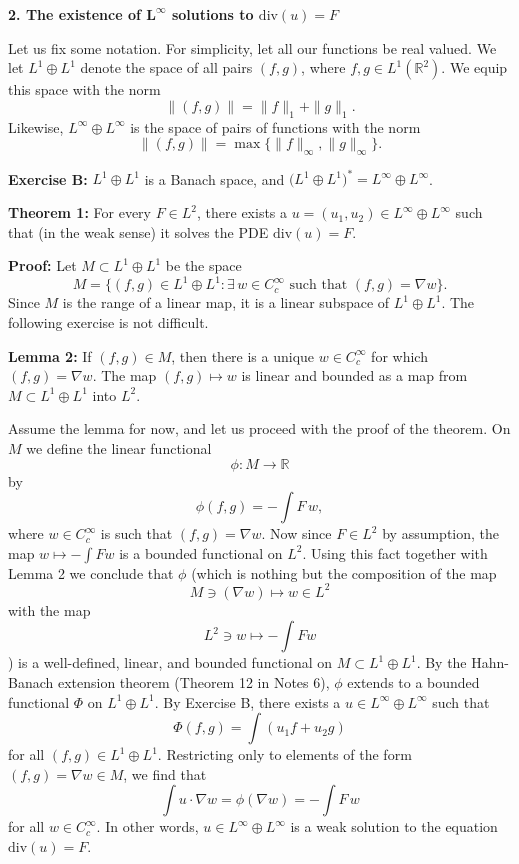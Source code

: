 \documentclass[12pt]{article}
\begin{document}
\bigskip

\noindent
\textbf{2. The existence of \(\boldsymbol{L^\infty}\) solutions to \(\mathrm{div}(u) = F\)}

Let us fix some notation. For simplicity, let all our functions be real valued. We let \(L^1 \oplus L^1\) denote the space of all pairs \((f,g)\), where \(f,g \in L^1(\mathbb{R}^2)\). We equip this space with the norm
\[
\|(f,g)\| = \|f\|_1 + \|g\|_1.
\]
Likewise, \(L^\infty \oplus L^\infty\) is the space of pairs of functions with the norm
\[
\|(f,g)\| = \max\{\|f\|_\infty, \|g\|_\infty\}.
\]

\medskip
\noindent
\textbf{Exercise B:} \(L^1 \oplus L^1\) is a Banach space, and \(\bigl(L^1 \oplus L^1\bigr)^* = L^\infty \oplus L^\infty\).

\medskip
\noindent
\textbf{Theorem 1:} For every \(F \in L^2\), there exists a \(u = (u_1, u_2) \in L^\infty \oplus L^\infty\) such that (in the weak sense) it solves the PDE \(\mathrm{div}(u) = F\).

\medskip
\noindent
\textbf{Proof:}
Let \(M \subset L^1 \oplus L^1\) be the space
\[
M = \{(f,g) \in L^1 \oplus L^1 : \exists\, w \in C_c^\infty \text{ such that }(f,g) = \nabla w\}.
\]
Since \(M\) is the range of a linear map, it is a linear subspace of \(L^1 \oplus L^1\). The following exercise is not difficult.

\medskip
\noindent
\textbf{Lemma 2:} If \((f,g) \in M\), then there is a unique \(w \in C_c^\infty\) for which \((f,g) = \nabla w\). The map \((f,g)\mapsto w\) is linear and bounded as a map from \(M \subset L^1 \oplus L^1\) into \(L^2\).

\medskip

Assume the lemma for now, and let us proceed with the proof of the theorem. On \(M\) we define the linear functional
\[
\phi : M \to \mathbb{R}
\]
by
\[
\phi(f,g) = -\int F\, w,
\]
where \(w \in C_c^\infty\) is such that \((f,g) = \nabla w\). Now since \(F \in L^2\) by assumption, the map \(w \mapsto -\int F w\) is a bounded functional on \(L^2\). Using this fact together with Lemma 2 we conclude that \(\phi\) (which is nothing but the composition of the map 
\[
M \ni (\nabla w) \mapsto w \in L^2
\]
with the map
\[
L^2 \ni w \mapsto -\int Fw
\]
) is a well-defined, linear, and bounded functional on \(M \subset L^1 \oplus L^1\). By the Hahn-Banach extension theorem (Theorem 12 in Notes 6), \(\phi\) extends to a bounded functional \(\Phi\) on \(L^1 \oplus L^1\). By Exercise B, there exists a \(u \in L^\infty \oplus L^\infty\) such that
\[
\Phi(f,g) = \int (u_1 f + u_2 g)
\]
for all \((f,g)\in L^1 \oplus L^1\). Restricting only to elements of the form \((f,g) = \nabla w \in M\), we find that
\[
\int u \cdot \nabla w = \phi(\nabla w) = - \int F\, w
\]
for all \(w \in C_c^\infty\). In other words, \(u \in L^\infty \oplus L^\infty\) is a weak solution to the equation \(\mathrm{div}(u) = F\).
\end{document}
